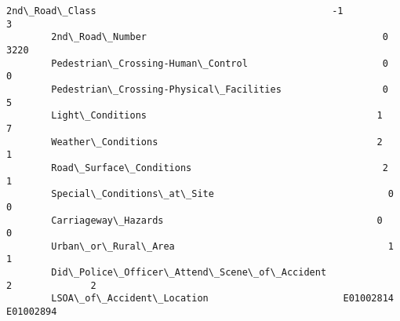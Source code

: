 \documentclass[11pt]{article}
\begin{document}
\begin{Verbatim}[commandchars=\\\{\}]
        2nd\_Road\_Class                                          -1              3   
        2nd\_Road\_Number                                          0           3220   
        Pedestrian\_Crossing-Human\_Control                        0              0   
        Pedestrian\_Crossing-Physical\_Facilities                  0              5   
        Light\_Conditions                                         1              7   
        Weather\_Conditions                                       2              1   
        Road\_Surface\_Conditions                                  2              1   
        Special\_Conditions\_at\_Site                               0              0   
        Carriageway\_Hazards                                      0              0   
        Urban\_or\_Rural\_Area                                      1              1   
        Did\_Police\_Officer\_Attend\_Scene\_of\_Accident              2              2   
        LSOA\_of\_Accident\_Location                        E01002814      E01002894   
        

\end{Verbatim}
\end{document}
